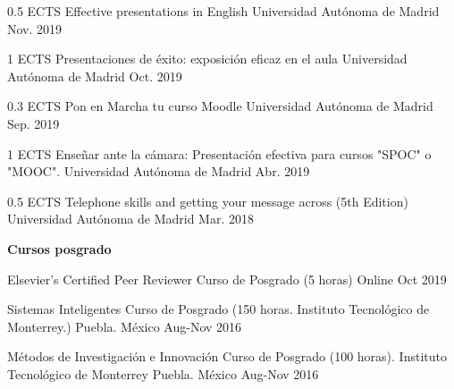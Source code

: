 \begin{cventries}
	\cventry
	{0.5 ECTS} %
	{Effective presentations in English} %
	{Universidad Autónoma de Madrid} %
	{Nov. 2019} %
	{}
	
	\cventry
	{1 ECTS} %
	{Presentaciones de éxito: exposición eficaz en el aula} %
	{Universidad Autónoma de Madrid} %
	{Oct. 2019} %
	{}
	
	\cventry
	{0.3 ECTS} %
	{Pon en Marcha tu curso Moodle} %
	{Universidad Autónoma de Madrid} %
	{Sep. 2019} %
	{}
	
	\cventry
	{1 ECTS} %
	{Enseñar ante la cámara: Presentación efectiva para cursos "SPOC" o
		"MOOC".} %
	{Universidad Autónoma de Madrid} %
	{Abr. 2019} %
	{}
	
	\cventry
	{0.5 ECTS} %
	{Telephone skills and getting your message across (5th Edition)} %
	{Universidad Autónoma de Madrid} %
	{Mar. 2018} %
	{}
	
\end{cventries}


\textbf{Cursos posgrado}
\begin{cvhonors}
   \cvhonor
	{Elsevier’s Certified Peer Reviewer} %
	{Curso de Posgrado (5 horas)} %
	{Online} %
	{Oct 2019} %

   \cvhonor
	{Sistemas Inteligentes} %
	{Curso de Posgrado (150 horas. Instituto Tecnológico de Monterrey.)} %
	{Puebla. México} %
	{Aug-Nov 2016} %
	
   \cvhonor
	{Métodos de Investigación e Innovación} %
	{Curso de Posgrado (100 horas). Instituto Tecnológico de Monterrey} %
	{Puebla. México} %
	{Aug-Nov 2016} %
\end{cvhonors}

